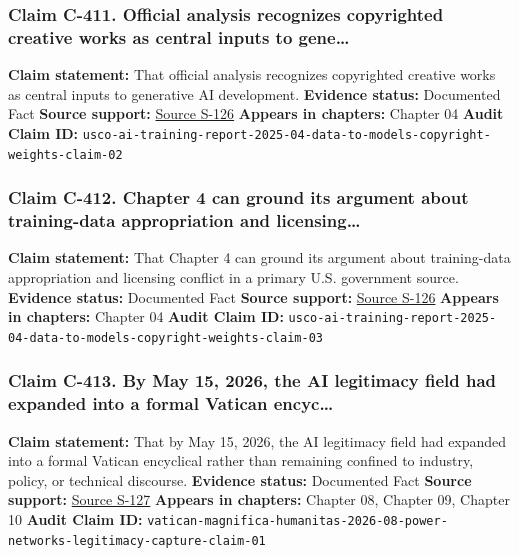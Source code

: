 \documentclass[
  american,
  11pt,
  letterpaper,
]{article}
\begin{document}
\subsubsection{Claim C-411. Official analysis recognizes copyrighted
creative works as central inputs to
gene\ldots{}}\label{claim-c-411-official-analysis-recognizes-copyrighted-creative-works-as-central-inputs-to-gene}

\textbf{Claim statement:} That official analysis recognizes copyrighted
creative works as central inputs to generative AI development.
\textbf{Evidence status:} Documented Fact \textbf{Source support:}
\hyperref[source-s-126-copyright-and-artificial-intelligence-part-3-generative-ai-training-pre-publication-version]{Source
S-126} \textbf{Appears in chapters:} Chapter 04 \textbf{Audit Claim ID:}
\texttt{usco-ai-training-report-2025-04-data-to-models-copyright-weights-claim-02}

\subsubsection{Claim C-412. Chapter 4 can ground its argument about
training-data appropriation and
licensing\ldots{}}\label{claim-c-412-chapter-4-can-ground-its-argument-about-training-data-appropriation-and-licensing}

\textbf{Claim statement:} That Chapter 4 can ground its argument about
training-data appropriation and licensing conflict in a primary U.S.
government source. \textbf{Evidence status:} Documented Fact
\textbf{Source support:}
\hyperref[source-s-126-copyright-and-artificial-intelligence-part-3-generative-ai-training-pre-publication-version]{Source
S-126} \textbf{Appears in chapters:} Chapter 04 \textbf{Audit Claim ID:}
\texttt{usco-ai-training-report-2025-04-data-to-models-copyright-weights-claim-03}

\subsubsection{Claim C-413. By May 15, 2026, the AI legitimacy field had
expanded into a formal Vatican
encyc\ldots{}}\label{claim-c-413-by-may-15-2026-the-ai-legitimacy-field-had-expanded-into-a-formal-vatican-encyc}

\textbf{Claim statement:} That by May 15, 2026, the AI legitimacy field
had expanded into a formal Vatican encyclical rather than remaining
confined to industry, policy, or technical discourse. \textbf{Evidence
status:} Documented Fact \textbf{Source support:}
\hyperref[source-s-127-encyclical-letter-of-his-holiness-leo-xiv-magnifica-humanitas]{Source
S-127} \textbf{Appears in chapters:} Chapter 08, Chapter 09, Chapter 10
\textbf{Audit Claim ID:}
\texttt{vatican-magnifica-humanitas-2026-08-power-networks-legitimacy-capture-claim-01}
\end{document}

